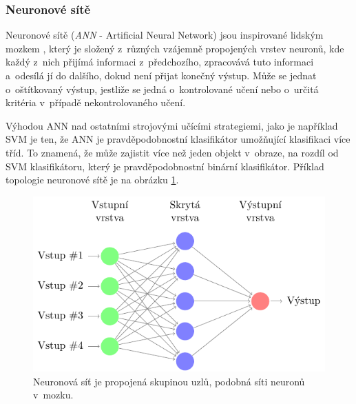 \subsubsection*{Neuronové sítě}
Neuronové sítě (\textit{ANN} - Artificial Neural Network) jsou inspirované lidským mozkem \cite{ann}, který je složený z~různých vzájemně propojených vrstev neuronů, kde každý z~nich přijímá informaci z~předchozího, zpracovává tuto informaci a~odesílá jí do dalšího, dokud není přijat konečný výstup. Může se jednat o~oštítkovaný výstup, jestliže se jedná o~kontrolované učení nebo o~určitá kritéria v~případě nekontrolovaného učení.

Výhodou ANN nad ostatními strojovými učícími strategiemi, jako je například SVM je ten, že ANN je pravděpodobnostní klasifikátor umožňující klasifikaci více tříd. To znamená, že může zajistit více než jeden objekt v~obraze, na rozdíl od SVM klasifikátoru, který je pravděpodobnostní binární klasifikátor. Příklad topologie neuronové sítě je na obrázku \ref{fig:ann}. 
\begin{figure}[H]
\centering
\includegraphics[width=.87\linewidth]{figures/ann.pdf}
\caption{Neuronová síť je propojená skupinou uzlů, podobná síti neuronů v~mozku.}
\label{fig:ann}
\end{figure}

